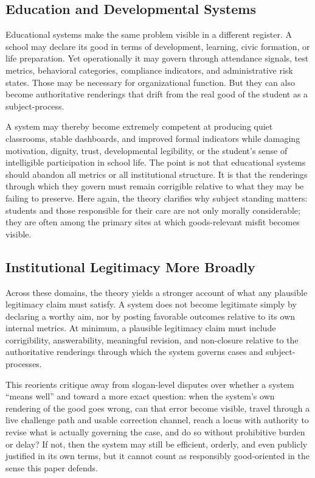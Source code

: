 \documentclass[11pt]{article}
\begin{document}
\subsection{Education and Developmental Systems}

Educational systems make the same problem visible in a different register. A school may declare its good in terms of development, learning, civic formation, or life preparation. Yet operationally it may govern through attendance signals, test metrics, behavioral categories, compliance indicators, and administrative risk states. Those may be necessary for organizational function. But they can also become authoritative renderings that drift from the real good of the student as a subject-process.

A system may thereby become extremely competent at producing quiet classrooms, stable dashboards, and improved formal indicators while damaging motivation, dignity, trust, developmental legibility, or the student's sense of intelligible participation in school life. The point is not that educational systems should abandon all metrics or all institutional structure. It is that the renderings through which they govern must remain corrigible relative to what they may be failing to preserve. Here again, the theory clarifies why subject standing matters: students and those responsible for their care are not only morally considerable; they are often among the primary sites at which goods-relevant misfit becomes visible.

\subsection{Institutional Legitimacy More Broadly}

Across these domains, the theory yields a stronger account of what any plausible legitimacy claim must satisfy. A system does not become legitimate simply by declaring a worthy aim, nor by posting favorable outcomes relative to its own internal metrics. At minimum, a plausible legitimacy claim must include corrigibility, answerability, meaningful revision, and non-closure relative to the authoritative renderings through which the system governs cases and subject-processes.

This reorients critique away from slogan-level disputes over whether a system ``means well'' and toward a more exact question: when the system's own rendering of the good goes wrong, can that error become visible, travel through a live challenge path and usable correction channel, reach a locus with authority to revise what is actually governing the case, and do so without prohibitive burden or delay? If not, then the system may still be efficient, orderly, and even publicly justified in its own terms, but it cannot count as responsibly good-oriented in the sense this paper defends.
\end{document}

